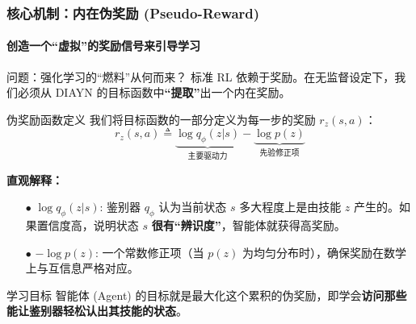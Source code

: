 \documentclass{beamer}
\begin{document}
\begin{frame}
    \frametitle{核心机制：内在伪奖励 (Pseudo-Reward)}
    \framesubtitle{创造一个“虚拟”的奖励信号来引导学习}

    \begin{block}{问题：强化学习的“燃料”从何而来？}
        标准 RL 依赖于奖励。在无监督设定下，我们必须从 DIAYN 的目标函数中\textbf{“提取”}出一个内在奖励。
    \end{block}

    \begin{exampleblock}{伪奖励函数定义}
        我们将目标函数的一部分定义为每一步的奖励 $r_z(s, a)$：
        \[
            r_z(s, a) \triangleq \underbrace{\log q_\phi(z | s)}_{\text{主要驱动力}} - \underbrace{\log p(z)}_{\text{先验修正项}}
        \]
        
        \textbf{直观解释：}
        \begin{itemize}
            \item[$\bullet$] $\log q_\phi(z|s)$: 鉴别器 $q_\phi$ 认为当前状态 $s$ 多大程度上是由技能 $z$ 产生的。如果置信度高，说明状态 $s$ \textbf{很有“辨识度”}，智能体就获得高奖励。
            \item[$\bullet$] $-\log p(z)$: 一个常数修正项（当 $p(z)$ 为均匀分布时），确保奖励在数学上与互信息严格对应。
        \end{itemize}
    \end{exampleblock}

    \begin{alertblock}{学习目标}
        智能体 (Agent) 的目标就是最大化这个累积的伪奖励，即学会\textbf{访问那些能让鉴别器轻松认出其技能的状态}。
    \end{alertblock}

\end{frame}
\end{document}
